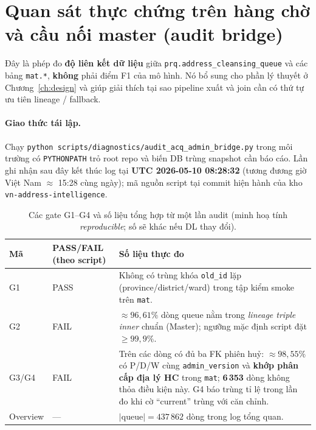 \section{Quan sát thực chứng trên hàng chờ và cầu nối master (audit bridge)}
\label{sec:audit-bridge}

Đây là phép đo \textbf{độ liên kết dữ liệu} giữa \texttt{prq.address\_cleansing\_queue} và các bảng \texttt{mat.*}, \textbf{không} phải điểm F1 của mô hình. Nó bổ sung cho phần lý thuyết ở Chương~\ref{ch:design} và giúp giải thích tại sao pipeline xuất và join cần có thứ tự ưu tiên lineage / fallback.

\paragraph{Giao thức tái lập.} Chạy \texttt{python scripts/diagnostics/audit\_acq\_admin\_bridge.py} trong môi trường có \texttt{PYTHONPATH} trỏ root repo và biến DB trùng snapshot cần báo cáo. Lần ghi nhận sau đây kết thúc log tại \textbf{UTC 2026-05-10 08:28:32} (tương đương giờ Việt Nam \(\approx\) 15:28 cùng ngày); mã nguồn script tại commit hiện hành của kho \texttt{vn-address-intelligence}.

\begin{table}[h]
\centering
\caption{Các gate G1--G4 và số liệu tổng hợp từ một lần audit (minh hoạ tính \emph{reproducible}; số sẽ khác nếu DL thay đổi).}
\label{tab:audit-gates}
\begin{tabular}{@{}llp{7.2cm}@{}}
\toprule
\textbf{Mã} & \textbf{PASS/FAIL (theo script)} & \textbf{Số liệu thực đo} \\
\midrule
G1 & PASS & Không có trùng khóa \texttt{old\_id} lặp (province/district/ward) trong tập kiểm smoke trên \texttt{mat}. \\
G2 & FAIL & \(\approx 96{,}61\%\) dòng queue nằm trong \emph{lineage triple inner} chuẩn (Master); ngưỡng mặc định script đặt \(\ge 99{,}9\%\). \\
G3/G4 & FAIL & Trên các dòng có đủ ba FK phiên huỷ: \(\approx 98{,}55\%\) có P/D/W cùng \texttt{admin\_version} và \textbf{khớp phân cấp địa lý HC} trong \texttt{mat}; \textbf{6\,353} dòng không thỏa điều kiện này. G4 báo trùng tỉ lệ trong lần đo khi cờ ``current'' trùng với căn chỉnh. \\
Overview & --- & \(\lvert\text{queue}\rvert = 437\,862\) dòng trong log tổng quan. \\
\bottomrule
\end{tabular}
\end{table}

